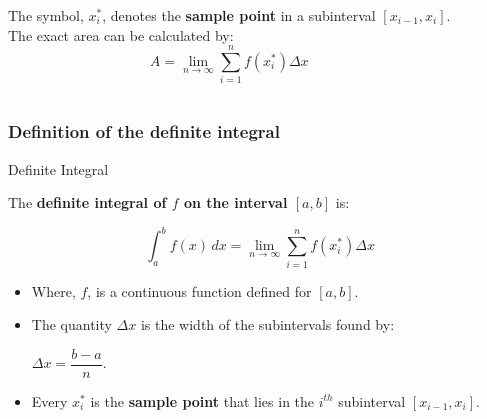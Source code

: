 \documentclass{beamer}
\begin{document}
\begin{frame}
\begin{columns}[t]
\pause
{} 
\begin{block}{}
The symbol, $x^*_i$, denotes the {\bfseries{sample point}} in a subinterval $\left[x_{i-1},x_i\right]$.
\\
\vspace{1pc}
\pause
The exact area can be calculated by:
		\[A=\lim_{n\to\infty}\sum_{i=1}^{n}f(x^*_i)\Delta{x}\]
\end{block}
 \end{columns}
\end{frame}


\begin{frame}[plain]
\frametitle{Definition of the definite integral} 
 
 \begin{block}{Definite Integral}
 
The {\bfseries{definite integral of $f$ on the interval $[a,b]$}} is: 
 
 \[ \int_a^b f(x)\,dx = \lim_{n\to\infty}\sum_{i=1}^{n}f(x^*_i)\Delta{x}\] 
 \pause
\small{ 
\begin{itemize}
\item Where, $f$, is a continuous function defined for $\left[a,b \right]$.
\pause
\item The quantity $\Delta{x}$ is the width of the subintervals found by: 
\begin{center}
$\Delta{x}= \dfrac{b-a}{n}$.
\end{center}
\pause
\item Every $x^*_i$ is the  {\bfseries sample point} that lies in the $i^{th}$ subinterval $[x_{i-1},x_i]$.
\end{itemize}}

\end{block}
 
 
 \end{frame}
 
\end{document}
